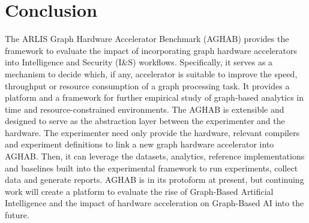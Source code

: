 \section{Conclusion}\label{section:conclusion}
The ARLIS Graph Hardware Accelerator Benchmark (AGHAB) provides the framework to evaluate the impact of incorporating graph hardware accelerators into Intelligence and Security (I\&S) workflows. 
Specifically, it serves as a mechanism to decide which, if any, accelerator is suitable to improve the speed, throughput or resource consumption of a graph processing task.
It provides a platform and a framework for further empirical study of graph-based analytics in time and resource-constrained environments. 
The AGHAB is extensible and designed to serve as the abstraction layer between the experimenter and the hardware. 
The experimenter need only provide the hardware, relevant compilers and experiment definitions to link a new graph hardware accelerator into AGHAB.
Then, it can leverage the datasets, analytics, reference implementations and baselines built into the experimental framework to run experiments, collect data and generate reports. 
AGHAB is in its protoform at present, but continuing work will create a platform to evaluate the rise of Graph-Based Artificial Intelligence and the impact of hardware acceleration on Graph-Based AI into the future. 